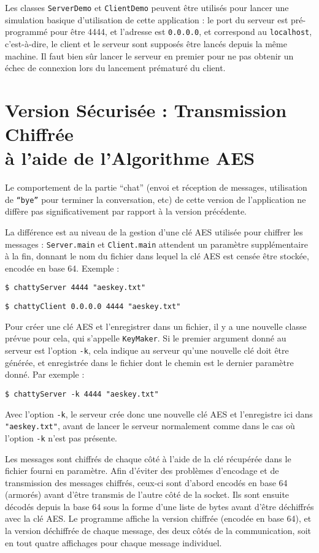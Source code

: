 \documentclass[a4paper,12pt]{article}
\newcommand{\code}[1]{\texttt{#1}}
\begin{document}
    Les classes \code{ServerDemo} et \code{ClientDemo} peuvent être utilisés pour lancer une simulation basique d'utilisation de cette application : le port du serveur est pré-programmé pour être 4444, et l'adresse est \code{0.0.0.0}, et correspond au \code{localhost}, c'est-à-dire, le client et le serveur sont supposés être lancés depuis la même machine. Il faut bien sûr lancer le serveur en premier pour ne pas obtenir un échec de connexion lors du lancement prématuré du client.
    
    \section{Version Sécurisée : Transmission Chiffrée \\ à l'aide de l'Algorithme AES}
    
    Le comportement de la partie ``chat'' (envoi et réception de messages, utilisation de \code{``bye''} pour terminer la conversation, etc) de cette version de l'application ne diffère pas significativement par rapport à la version précédente.
    
    La différence est au niveau de la gestion d'une clé AES utilisée pour chiffrer les messages : \code{Server.main} et \code{Client.main} attendent un paramètre supplémentaire à la fin, donnant le nom du fichier dans lequel la clé AES est censée être stockée, encodée en base 64. Exemple :
    
    \code{\$ chattyServer 4444 "aeskey.txt"}
    
    \code{\$ chattyClient 0.0.0.0 4444 "aeskey.txt"}
    
    Pour créer une clé AES et l'enregistrer dans un fichier, il y a une nouvelle classe prévue pour cela, qui s'appelle \code{KeyMaker}. Si le premier argument donné au serveur est l'option \code{-k}, cela indique au serveur qu'une nouvelle clé doit être générée, et enregistrée dans le fichier dont le chemin est le dernier paramètre donné. Par exemple :
    
    \code{\$ chattyServer -k 4444 "aeskey.txt"}
    
    Avec l'option \code{-k}, le serveur crée donc une nouvelle clé AES et l'enregistre ici dans \code{"aeskey.txt"}, avant de lancer le serveur normalement comme dans le cas où l'option \code{-k} n'est pas présente.
    
    Les messages sont chiffrés de chaque côté à l'aide de la clé récupérée dans le fichier fourni en paramètre. Afin d'éviter des problèmes d'encodage et de transmission des messages chiffrés, ceux-ci sont d'abord encodés en base 64 (armorés) avant d'être transmis de l'autre côté de la socket. Ils sont ensuite décodés depuis la base 64 sous la forme d'une liste de bytes avant d'être déchiffrés avec la clé AES. Le programme affiche la version chiffrée (encodée en base 64), et la version déchiffrée de chaque message, des deux côtés de la communication, soit en tout quatre affichages pour chaque message individuel.
    
\end{document}
